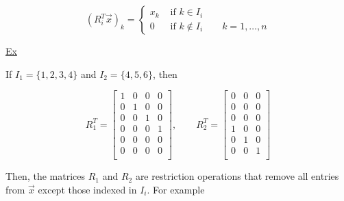 \begin{equation*}
    (R_i^T \vec{x})_k = \begin{cases}
        x_k & \text{ if } k\in I_i\\
        0 & \text{ if } k \notin I_i \qquad k=1, \ldots, n
\end{cases}
\end{equation*}

\underline{Ex}

If $I_1=\{ 1, 2, 3, 4 \}$ and  $I_2 = \{ 4, 5, 6 \}$, then

\begin{equation*}
    R_1^T =
    \begin{bmatrix}
            1 & 0 & 0 & 0 \\
            0 & 1 & 0 & 0 \\
            0 & 0 & 1 & 0 \\
            0 & 0 & 0 & 1 \\
            0 & 0 & 0 & 0 \\
            0 & 0 & 0 & 0 \\
    \end{bmatrix},
    \qquad
    R_2^T =
    \begin{bmatrix}
            0 & 0 & 0 \\
            0 & 0 & 0 \\
            0 & 0 & 0 \\
            1 & 0 & 0 \\
            0 & 1 & 0 \\
            0 & 0 & 1 \\
    \end{bmatrix}
\end{equation*}

Then, the matrices $R_1$ and $R_2$ are restriction operations that remove all entries from $\vec{x}$ except those indexed in $I_i$. For example

